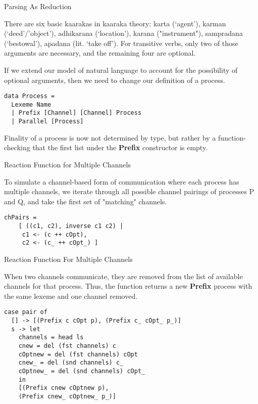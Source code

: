 \documentclass{article}
\begin{document}
\begin{frame}[fragile]{Parsing As Reduction}

There are six basic kaarakas in kaaraka theory: karta (‘agent’), karman (‘deed’/’object’), adhikarana (‘location’), karana ("instrument"), sampradana (‘bestowal’), apadana (lit. ‘take off’). For transitive verbs, only two of those arguments are necessary, and the remaining four are optional.

If we extend our model of natural language to account for the possibility of optional arguments, then we need to change our definition of a process.

\begin{lstlisting}
data Process =
  Lexeme Name
  | Prefix [Channel] [Channel] Process
  | Parallel [Process]
\end{lstlisting}

Finality of a process is now not determined by type, but rather by a function- checking that the first list under the \textbf{Prefix} constructor is empty.

\end{frame}

\begin{frame}[fragile]{Reaction Function for Multiple Channels}

To simulate a channel-based form of communication where each process has multiple channels, we iterate through all possible channel pairings of processes P and Q, and take the first set of "matching" channels.

\begin{lstlisting}
chPairs = 
    [ ((c1, c2), inverse c1 c2) | 
     c1 <- (c ++ cOpt), 
     c2 <- (c_ ++ cOpt_) ]
\end{lstlisting}

\end{frame}

\begin{frame}[fragile]{Reaction Function For Multiple Channels}

When two channels communicate, they are removed from the list of available channels for that process. Thus, the function returns a new \textbf{Prefix} process with the same lexeme and one channel removed.

\begin{lstlisting}
case pair of
  [] -> [(Prefix c cOpt p), (Prefix c_ cOpt_ p_)]
  s -> let
    channels = head ls
    cnew = del (fst channels) c
    cOptnew = del (fst channels) cOpt
    cnew_ = del (snd channels) c_
    cOptnew_ = del (snd channels) cOpt_
    in
    [(Prefix cnew cOptnew p), 
    (Prefix cnew_ cOptnew_ p_)]
\end{lstlisting}

\end{frame}
\end{document}
